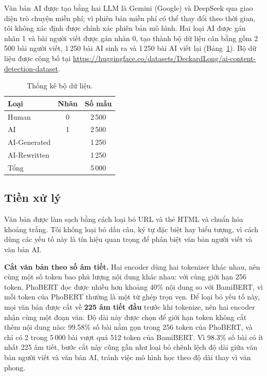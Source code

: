\documentclass[conference,a4paper]{IEEEtran}
\begin{document}
Văn bản AI được tạo bằng hai LLM là Gemini (Google) và DeepSeek qua giao diện trò chuyện miễn phí; vì phiên bản miễn phí có thể thay đổi theo thời gian, tôi không xác định được chính xác phiên bản mô hình. Hai loại AI được gán nhãn 1 và bài người viết được gán nhãn 0, tạo thành bộ dữ liệu cân bằng gồm 2\,500 bài người viết, 1\,250 bài AI sinh ra và 1\,250 bài AI viết lại (Bảng~\ref{tab:dataset}). Bộ dữ liệu được công bố tại \url{https://huggingface.co/datasets/DeckardLong/ai-content-detection-dataset}.

\begin{table}[t]
  \centering
  \caption{Thống kê bộ dữ liệu.}
  \label{tab:dataset}
  \setlength{\tabcolsep}{8pt}
  \begin{tabular}{lcc}
    \toprule
    Loại & Nhãn & Số mẫu \\
    \midrule
    Human & 0 & 2\,500 \\
    AI    & 1 & 2\,500 \\
    \quad AI-Generated &   & 1\,250 \\
    \quad AI-Rewritten &   & 1\,250 \\
    \midrule
    Tổng  &   & 5\,000 \\
    \bottomrule
  \end{tabular}
\end{table}

\subsection{Tiền xử lý}
Văn bản được làm sạch bằng cách loại bỏ URL và thẻ HTML và chuẩn hóa khoảng trắng. Tôi không loại bỏ dấu câu, ký tự đặc biệt hay biểu tượng, vì cách dùng các yếu tố này là tín hiệu quan trọng để phân biệt văn bản người viết và văn bản AI.

\textbf{Cắt văn bản theo số âm tiết.} Hai encoder dùng hai tokenizer khác nhau, nên cùng một số token bao phủ lượng nội dung khác nhau: với cùng giới hạn 256 token, PhoBERT đọc được nhiều hơn khoảng 40\% nội dung so với BamiBERT, vì mỗi token của PhoBERT thường là một từ ghép trọn vẹn. Để loại bỏ yếu tố này, mọi văn bản được cắt về \textbf{225 âm tiết đầu} trước khi tokenize, nên hai encoder nhận cùng một đoạn văn. Độ dài này được chọn để giới hạn token không cắt thêm nội dung nào: 99.58\% số bài nằm gọn trong 256 token của PhoBERT, và chỉ có 2 trong 5\,000 bài vượt quá 512 token của BamiBERT. Vì 98.3\% số bài có ít nhất 225 âm tiết, bước cắt này cũng gần như loại bỏ chênh lệch độ dài giữa văn bản người viết và văn bản AI, tránh việc mô hình học theo độ dài thay vì văn phong.
\end{document}
